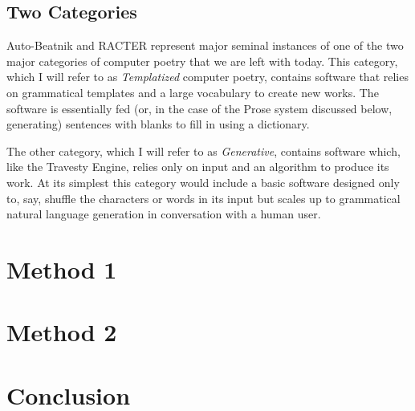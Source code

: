 \documentclass[10pt]{article}
\begin{document}
\subsection{Two Categories}
Auto-Beatnik and RACTER represent major seminal instances of one of the two
major categories of computer poetry that we are left with today. This category,
which I will refer to as \emph{Templatized} computer poetry, contains software
that relies on grammatical templates and a large vocabulary to create new
works. The software is essentially fed (or, in the case of the Prose system
discussed below, generating) sentences with blanks to fill in using a
dictionary.

The other category, which I will refer to as \emph{Generative}, contains
software which, like the Travesty Engine, relies only on input and an algorithm
to produce its work. At its simplest this category would include a basic
software designed only to, say, shuffle the characters or words in its input
but scales up to grammatical natural language generation in conversation with a
human user.

\section{Method 1}
\section{Method 2}
\section{Conclusion}



\end{document}
